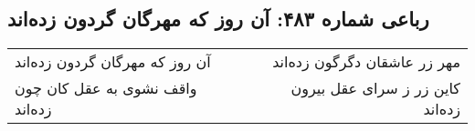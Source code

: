 \begin{center}
\section*{رباعی شماره ۴۸۳: آن روز که مهرگان گردون زده‌اند}
\label{sec:0483}
\begin{longtable}{l p{0.5cm} r}
آن روز که مهرگان گردون زده‌اند
&&
مهر زر عاشقان دگرگون زده‌اند
\\
واقف نشوی به عقل کان چون زده‌اند
&&
کاین زر ز سرای عقل بیرون زده‌اند
\\
\end{longtable}
\end{center}
